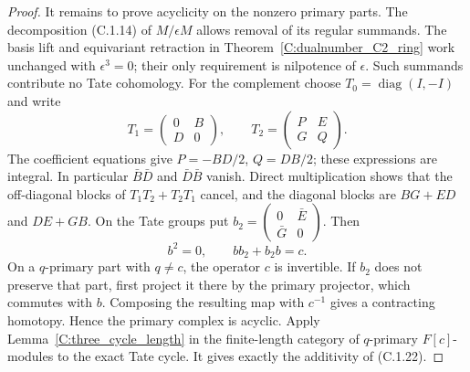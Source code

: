 \begin{proof}
It remains to prove acyclicity on the nonzero primary parts.
The decomposition (C.1.14) of $M/\epsilon M$ allows removal of
its regular summands. The basis lift and equivariant retraction
in Theorem~\ref{C:dualnumber_C2_ring} work unchanged with
$\epsilon^3=0$; their only requirement is nilpotence of
$\epsilon$. Such summands contribute no Tate cohomology.
For the complement choose $T_0=\operatorname{diag}(I,-I)$ and write
\[
 T_1=\begin{pmatrix}0&B\\D&0\end{pmatrix},\qquad
 T_2=\begin{pmatrix}P&E\\G&Q\end{pmatrix}.
\]
The coefficient equations give $P=-BD/2$, $Q=DB/2$;
these expressions are integral. In particular $\bar B\bar D$
and $\bar D\bar B$ vanish. Direct multiplication shows that
the off-diagonal blocks of $T_1T_2+T_2T_1$ cancel, and the
diagonal blocks are $BG+ED$ and $DE+GB$.
On the Tate groups put
$b_2=\left(\begin{smallmatrix}0&\bar E\\\bar G&0\end{smallmatrix}\right)$.
Then
\[
 b^2=0,\qquad bb_2+b_2b=c.
\]
On a $q$-primary part with $q\ne c$, the operator $c$ is
invertible. If $b_2$ does not preserve that part, first project
it there by the primary projector, which commutes with $b$.
Composing the resulting map with $c^{-1}$ gives a contracting
homotopy. Hence the primary complex is acyclic. Apply
Lemma~\ref{C:three_cycle_length} in the finite-length category
of $q$-primary $F[c]$-modules to the exact Tate cycle. It gives
exactly the additivity of (C.1.22).
\end{proof}

